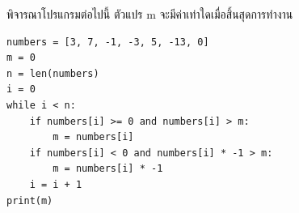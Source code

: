 \question พิจารณาโปรแกรมต่อไปนี้ ตัวแปร m จะมีค่าเท่าใดเมื่อสิ้นสุดการทำงาน
\begin{verbatim}
numbers = [3, 7, -1, -3, 5, -13, 0]
m = 0
n = len(numbers)
i = 0
while i < n:
    if numbers[i] >= 0 and numbers[i] > m:
        m = numbers[i]
    if numbers[i] < 0 and numbers[i] * -1 > m:
        m = numbers[i] * -1
    i = i + 1
print(m)
\end{verbatim}
